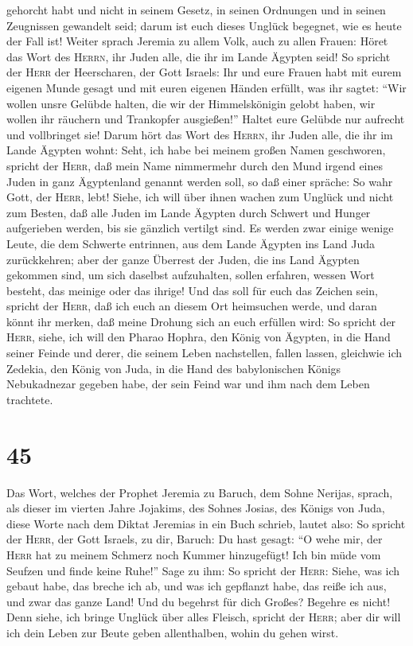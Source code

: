 gehorcht habt und nicht in seinem Gesetz, in seinen Ordnungen und in
seinen Zeugnissen gewandelt seid; darum ist euch dieses Unglück
begegnet, wie es heute der Fall ist!  Weiter sprach
Jeremia zu allem Volk, auch zu allen Frauen: Höret das Wort des
\textsc{Herrn}, ihr Juden alle, die ihr im Lande Ägypten seid!
 So spricht der \textsc{Herr} der Heerscharen, der Gott
Israels: Ihr und eure Frauen habt mit eurem eigenen Munde gesagt und mit
euren eigenen Händen erfüllt, was ihr sagtet: ``Wir wollen unsre Gelübde
halten, die wir der Himmelskönigin gelobt haben, wir wollen ihr räuchern
und Trankopfer ausgießen!'' Haltet eure Gelübde nur aufrecht und
vollbringet sie!  Darum hört das Wort des \textsc{Herrn},
ihr Juden alle, die ihr im Lande Ägypten wohnt: Seht, ich habe bei
meinem großen Namen geschworen, spricht der \textsc{Herr}, daß mein Name
nimmermehr durch den Mund irgend eines Juden in ganz Ägyptenland genannt
werden soll, so daß einer spräche: So wahr Gott, der \textsc{Herr},
lebt!  Siehe, ich will über ihnen wachen zum Unglück und
nicht zum Besten, daß alle Juden im Lande Ägypten durch Schwert und
Hunger aufgerieben werden, bis sie gänzlich vertilgt sind.
 Es werden zwar einige wenige Leute, die dem Schwerte
entrinnen, aus dem Lande Ägypten ins Land Juda zurückkehren; aber der
ganze Überrest der Juden, die ins Land Ägypten gekommen sind, um sich
daselbst aufzuhalten, sollen erfahren, wessen Wort besteht, das meinige
oder das ihrige!  Und das soll für euch das Zeichen sein,
spricht der \textsc{Herr}, daß ich euch an diesem Ort heimsuchen werde,
und daran könnt ihr merken, daß meine Drohung sich an euch erfüllen
wird:  So spricht der \textsc{Herr}, siehe, ich will den
Pharao Hophra, den König von Ägypten, in die Hand seiner Feinde und
derer, die seinem Leben nachstellen, fallen lassen, gleichwie ich
Zedekia, den König von Juda, in die Hand des babylonischen Königs
Nebukadnezar gegeben habe, der sein Feind war und ihm nach dem Leben
trachtete.

\hypertarget{section-44}{%
\section{45}\label{section-44}}

 Das Wort, welches der Prophet Jeremia zu Baruch, dem
Sohne Nerijas, sprach, als dieser im vierten Jahre Jojakims, des Sohnes
Josias, des Königs von Juda, diese Worte nach dem Diktat Jeremias in ein
Buch schrieb, lautet also:  So spricht der \textsc{Herr},
der Gott Israels, zu dir, Baruch:  Du hast gesagt: ``O
wehe mir, der \textsc{Herr} hat zu meinem Schmerz noch Kummer
hinzugefügt! Ich bin müde vom Seufzen und finde keine Ruhe!''
 Sage zu ihm: So spricht der \textsc{Herr}: Siehe, was ich
gebaut habe, das breche ich ab, und was ich gepflanzt habe, das reiße
ich aus, und zwar das ganze Land!  Und du begehrst für
dich Großes? Begehre es nicht! Denn siehe, ich bringe Unglück über alles
Fleisch, spricht der \textsc{Herr}; aber dir will ich dein Leben zur
Beute geben allenthalben, wohin du gehen wirst.

